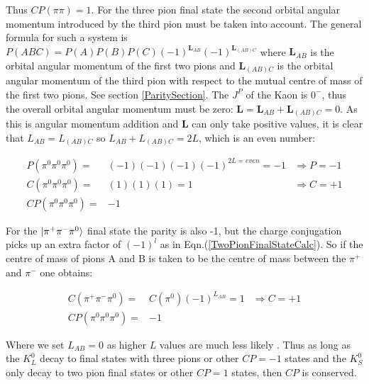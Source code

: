 \noindent Thus ${C}{P} (\pi \pi) = 1$. For the three pion final state the second orbital angular momentum introduced by the third pion must be taken into account. The general formula for such a system is ${P} (ABC) = {P} (A) {P} (B) {P}(C) (-1)^{\mathbf{L}_{AB}} (-1)^{\mathbf{L}_{(AB)C}}$ where $\mathbf{L}_{AB}$ is the orbital angular momentum of the first two pions and $\mathbf{L}_{(AB)C}$ is the orbital angular momentum of the third pion with respect to the mutual centre of mass of the first two pions. See section \ref{ParitySection}. The $J^{P}$ of the Kaon is $0^{-}$, thus the overall orbital angular momentum must be zero: $\mathbf{L} = \mathbf{L}_{AB} + \mathbf{L}_{(AB)C} = 0$. As this is angular momentum addition and $\mathbf{L}$ can only take positive values, it is clear that ${L}_{AB} = {L}_{(AB)C}$ so ${L}_{AB} + {L}_{(AB)C} = 2L$, which is an even number: 

\begin{align*}
P(\pi^0 \pi^0 \pi^0)  = & (-1)(-1)(-1)(-1)^{2L = even} = -1 & \Rightarrow P = -1 \\
C(\pi^0 \pi^0 \pi^0)  = & (1)(1)(1) = 1                     & \Rightarrow C = +1 \\
CP(\pi^0 \pi^0 \pi^0) = & -1                                &
\end{align*}

\noindent For the $\ket{\pi^+ \pi^- \pi^0}$ final state the parity is also -1, but the charge conjugation picks up an extra factor of $(-1)^{l}$ as in Eqn.(\ref{TwoPionFinalStateCalc}). So if the centre of mass of pions A and B is taken to be the centre of mass between the $\pi^{+}$ and $\pi^{-}$ one obtains:

\begin{align*}
C(\pi^+ \pi^- \pi^0)  = & C(\pi^{0})(-1)^{{L}_{AB}} = 1     & \Rightarrow C = +1 \\
CP(\pi^0 \pi^0 \pi^0) = & -1                                &
\end{align*}
 
\noindent Where we set ${L}_{AB} = 0$ as higher $L$ values are much less likely \cite{Nakada}. Thus as long as the $K^{0}_{L}$ decay to final states with three pions or other $CP = -1$ states and the $K^{0}_{S}$ only decay to two pion final states or other $CP = 1$ states, then $CP$ is conserved.

